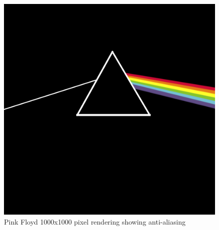 \begin{figure}[p]
\includegraphics[width=\linewidth,scale=0.1]{images/floyd}
\caption{Pink Floyd 1000x1000 pixel rendering showing anti-aliasing}
\label{figure:floyd}
\end{figure}



